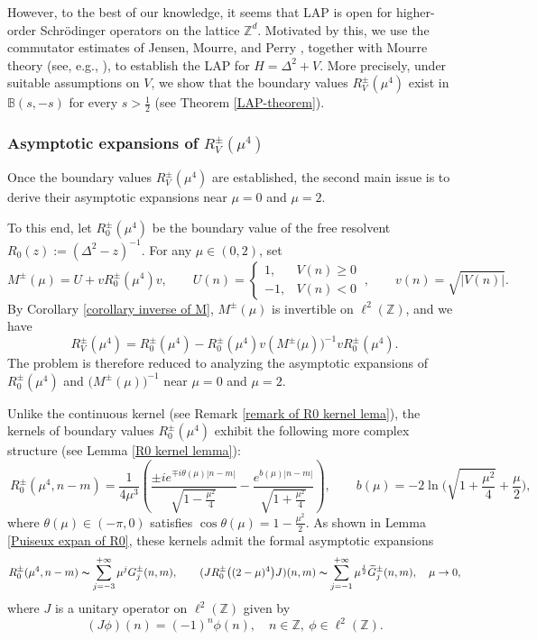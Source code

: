 \documentclass[reqno, 11pt]{amsart}
\newcommand\Z{\mathbb{Z}}
\newcommand\B{\mathbb{B}}
\numberwithin{equation}{section}
\begin{document}
However, to the best of our knowledge, it seems that LAP is  open for higher-order Schr\"{o}dinger operators on the lattice $\Z^d$. Motivated by this, we use the commutator estimates of Jensen, Mourre, and Perry \cite{JMP84}, together with Mourre theory (see, e.g., \cite{ABG96,Mou81,Mou83}), to establish the LAP for $H=\Delta^2+V$. More precisely, under suitable assumptions on $V$, we show that the boundary values $R_V^\pm(\mu^4)$ exist in $\B(s,-s)$ for every $s>\frac12$ (see Theorem \ref{LAP-theorem}).

\subsubsection{Asymptotic expansions of $R^{\pm}_{V}(\mu^4)$}\label{subsubsection of asy}
Once the boundary values $R_V^\pm(\mu^4)$ are established, the second main issue is to derive their asymptotic expansions near $\mu=0$ and $\mu=2$.

To this end, let $R^{\pm}_{0}(\mu^4)$ be the boundary value of the free resolvent $R_{0}(z):=(\Delta^2-z)^{-1}$. For any $\mu\in(0,2)$, set
\begin{equation}\label{Mpmmu}
M^{\pm}(\mu)=U+vR^{\pm}_{0}(\mu^4)v,\qquad U(n)=\begin{cases}
1,&V(n)\geq0\\
-1,&V(n)<0
\end{cases}\ ,\qquad v(n)=\sqrt{|V(n)|}.
\end{equation}
By Corollary \ref{corollary inverse of M},
$M^{\pm}(\mu)$ is invertible on $\ell^2(\Z)$, and we have 
 \begin{equation}\label{reso identity 1}
R^{\pm}_V(\mu^4)=R^{\pm}_{0}(\mu^4)-R^{\pm}_0(\mu^4)v\left(M^{\pm}(\mu\right))^{-1}vR^{\pm}_0(\mu^4).
\end{equation}
The problem is therefore reduced to analyzing the asymptotic expansions of $R^{\pm}_0(\mu^4)$ and $\bigl(M^{\pm}(\mu)\bigr)^{-1}$ near $\mu=0$ and $\mu=2$. 

Unlike the continuous kernel (see Remark \ref{remark of R0 kernel lema}), the kernels of boundary values $R^{\pm}_0(\mu^4)$ exhibit the following more complex structure (see Lemma \ref{R0 kernel lemma}):
 \begin{equation*}
  \ R^{\pm}_0(\mu^4,n-m)=\frac{1}{4\mu^3}\left(\frac{\pm ie^{\mp i\theta(\mu)|n-m|}}{\sqrt{1-\frac{\mu^2}{4}}}-\frac{e^{b(\mu)|n-m|}}{\sqrt{1+\frac{\mu^2}{4}}}\right),\qquad b(\mu)=-2\ln \Big(\sqrt{1+\frac{\mu^2}{4}}+\frac{\mu}{2}\Big),
  \end{equation*}
  where $\theta(\mu)\in(-\pi,0)$ satisfies $\cos\theta(\mu)=1-\frac{\mu^2}{2}$. As shown in Lemma \ref{Puiseux expan of R0}, these kernels admit the formal asymptotic expansions
\begin{align*}
R^{\pm}_0(\mu^4,n-m)\thicksim \sum\limits_{j=-3}^{+\infty}\mu^{j}G^{\pm}_j(n,m),\qquad
(JR^{\pm}_0\big((2-\mu)^4\big)J)(n,m)\thicksim\sum\limits_{j=-1}^{+\infty}\mu^{\frac{j}{2}}\widetilde{G}^{\pm}_j(n,m),\quad \mu\rightarrow0,
 \end{align*}
where $J$ is a unitary operator on $\ell^2(\Z)$ given by
\begin{equation}\label{J}
(J\phi)(n)=(-1)^{n}\phi(n), \quad n\in\Z,\ \phi\in\ell^2(\Z).
\end{equation}
 
\end{document}
